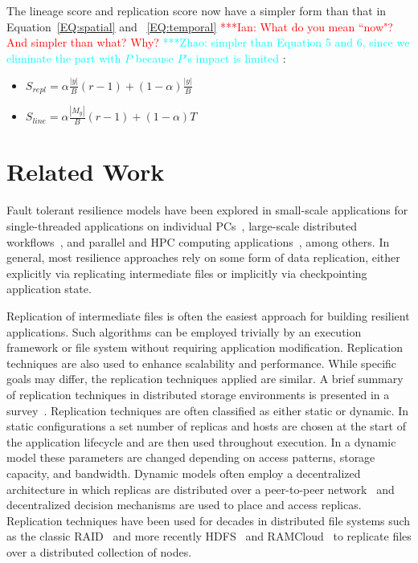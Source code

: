\documentclass{sig-alternate}
\newcommand{\iannote}[1]{ {\textcolor{red}    { ***Ian:      #1 }}}
\newcommand{\zhaonote}[1]{{\textcolor{cyan}    { ***Zhao:      #1 }}}
\newcommand{\iannote}[1]{}
\newcommand{\zhaonote}[1]{}
\begin{document}
The lineage score and replication score now have a simpler form than that in Equation~\ref{EQ:spatial} and ~\ref{EQ:temporal}
\iannote{What do you mean ``now"? And simpler than what? Why?}\zhaonote{simpler than Equation 5 and 6, since we eliminate the part with $P$ because $P$'s impact is limited}:
\begin{itemize}
  \item[] $S_{repl} = \alpha\frac{|y|}{B}(r-1) + (1-\alpha)\frac{|y|}{B} $
  \item[] $S_{line} = \alpha\frac{|M_y|}{B}(r-1) + (1-\alpha)T$
\end{itemize}


\section{Related Work}
\label{sec:Related}
Fault tolerant resilience models have been explored in small-scale applications for single-threaded applications on individual PCs~\cite{condor1988, libckpt1994}, large-scale distributed workflows~\cite{uncoordinated2010}, and parallel and HPC computing applications~\cite{mist1995, consistent1994,FTworkshop2009}, among others. In  general, most resilience approaches rely on some form of data replication, either explicitly via replicating intermediate files or implicitly via checkpointing application state.

Replication of intermediate files is often the easiest approach for building resilient applications. Such algorithms can be employed trivially by an execution framework or file system without requiring application modification. Replication techniques are also used to enhance scalability and performance. While specific goals may differ, the replication techniques applied are similar. A brief summary of replication techniques in distributed storage environments is presented in a survey~\cite{survey2012}. Replication techniques are often classified as either static or dynamic. In static configurations a set number of replicas and hosts are chosen at the start of the application lifecycle and are then used throughout execution. In a dynamic model these parameters are changed depending on access patterns, storage capacity, and bandwidth.  Dynamic models often employ a decentralized architecture in which replicas are distributed over a peer-to-peer network~\cite{chord} and decentralized decision mechanisms are used to place and access replicas. Replication techniques have been used for decades in distributed file systems such as the classic RAID~\cite{raid1988} and more recently HDFS~\cite{HDFS} and RAMCloud~\cite{ramcloud2010, ramcloud2014} to replicate files over a distributed collection of nodes.
\end{document}
